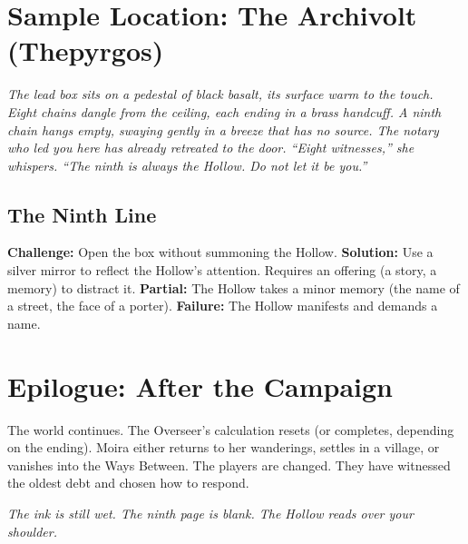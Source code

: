 \documentclass[11pt]{article}
\begin{document}
\section*{Sample Location: The Archivolt (Thepyrgos)}
\textit{The lead box sits on a pedestal of black basalt, its surface warm to the touch. Eight chains dangle from the ceiling, each ending in a brass handcuff. A ninth chain hangs empty, swaying gently in a breeze that has no source. The notary who led you here has already retreated to the door. ``Eight witnesses,'' she whispers. ``The ninth is always the Hollow. Do not let it be you.''}

\subsection*{The Ninth Line}
\textbf{Challenge:} Open the box without summoning the Hollow. \textbf{Solution:} Use a silver mirror to reflect the Hollow's attention. Requires an offering (a story, a memory) to distract it. \textbf{Partial:} The Hollow takes a minor memory (the name of a street, the face of a porter). \textbf{Failure:} The Hollow manifests and demands a name.

\section*{Epilogue: After the Campaign}
The world continues. The Overseer's calculation resets (or completes, depending on the ending). Moira either returns to her wanderings, settles in a village, or vanishes into the Ways Between. The players are changed. They have witnessed the oldest debt and chosen how to respond.

\vspace{2em}
\textit{The ink is still wet. The ninth page is blank. The Hollow reads over your shoulder.}
\end{document}
